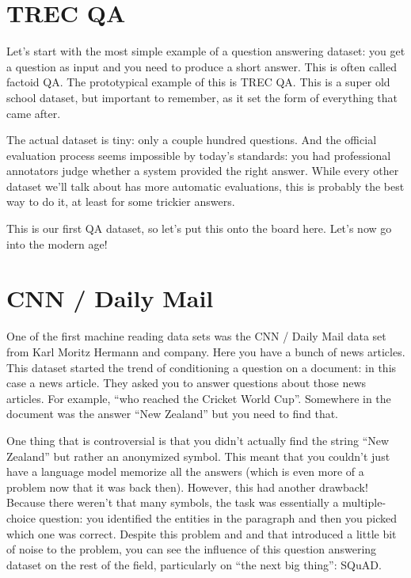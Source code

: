 \section{TREC QA}

Let’s start with the most simple example of a question answering dataset: you get a question as input and you need to produce a short answer.  This is often called factoid QA.  The prototypical example of this is TREC QA.  This is a super old school dataset, but important to remember, as it set the form of everything that came after.

The actual dataset is tiny: only a couple hundred questions.  And the official evaluation process seems impossible by today’s standards: you had professional annotators judge whether a system provided the right answer.  While every other dataset we’ll talk about has more automatic evaluations, this is probably the best way to do it, at least for some trickier answers.

This is our first QA dataset, so let’s put this onto the board here.  Let’s now go into the modern age!

\section{CNN / Daily Mail}

One of the first machine reading data sets was the CNN / Daily Mail data set from Karl Moritz Hermann and company.  Here you have a bunch of news articles.  This dataset started the trend of conditioning a question on a document: in this case a news article.  They asked you to answer questions about those news articles.  For example, “who reached the Cricket World Cup”.  Somewhere in the document was the answer “New Zealand” but you need to find that.

One thing that is controversial is that you didn’t actually find the string “New Zealand” but rather an anonymized symbol.  This meant that you couldn’t just have a language model memorize all the answers (which is even more of a problem now that it was back then).  However, this had another drawback!  Because there weren’t that many symbols, the task was essentially a multiple-choice question: you identified the entities in the paragraph and then you picked which one was correct.  Despite this problem and and that introduced a little bit of noise to the problem, you can see the influence of this question answering dataset on the rest of the field, particularly on “the next big thing”: SQuAD.

